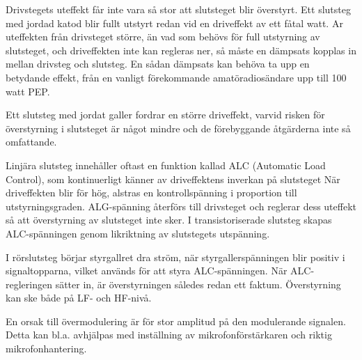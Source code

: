 Drivstegets uteffekt får inte vara så stor att slutsteget blir
överstyrt. Ett slutsteg med jordad katod blir fullt utstyrt redan vid
en driveffekt av ett fåtal watt. Ar uteffekten från drivsteget större,
än vad som behövs för full utstyrning av slutsteget, och driveffekten
inte kan regleras ner, så måste en dämpsats kopplas in mellan drivsteg
och slutsteg. En sådan dämpsats kan behöva ta upp en betydande effekt,
från en vanligt förekommande amatöradiosändare upp till 100 watt PEP.

\begin{rev-omarbetas}
Ett slutsteg med jordat galler fordrar en större driveffekt, varvid
risken för överstyrning i slutsteget är något mindre och de
förebyggande åtgärderna inte så omfattande.
\end{rev-omarbetas}

Linjära slutsteg innehåller oftast en funktion kallad ALC (Automatic
Load Control), som kontinuerligt känner av driveffektens inverkan på
slutsteget När driveffekten blir för hög, alstras en kontrollspänning
i proportion till utstyrningsgraden. ALG-spänning återförs till
drivsteget och reglerar dess uteffekt så att överstyrning av
slutsteget inte sker. I transistoriserade slutsteg skapas
ALC-spänningen genom likriktning av slutstegets utspänning.
\begin{rev-raderas}
I rörslutsteg börjar styrgallret dra ström, när styrgallerspänningen
blir positiv i signaltopparna, vilket används för att styra
ALC-spänningen. När ALC-regleringen sätter in, är överstyrningen
således redan ett faktum. Överstyrning kan ske både på LF- och HF-nivå.
\end{rev-raderas}

En orsak till övermodulering är för stor amplitud på den modulerande
signalen. Detta kan bl.a. avhjälpas med inställning av
mikrofonförstärkaren och riktig mikrofonhantering.
